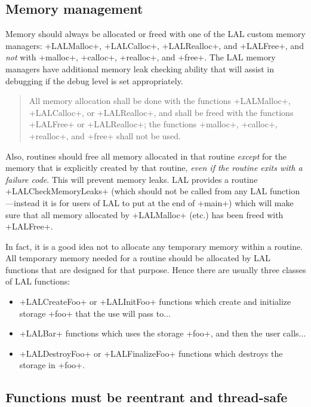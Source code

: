 \documentclass[10pt]{ligodcc}
\makeatletter
\def\verb{\relax\ifmmode\hbox\else\leavevmode\null\fi
  \bgroup
    \color{blue}\small
    \verb@eol@error \let\do\@makeother \dospecials
    \verbatim@font\@noligs
    \@ifstar\@sverb\@verb}
\newlength{\fminilength}
\newenvironment{fminipage}[1][\linewidth]
  {\setlength{\fminilength}{#1-2\fboxsep-2\fboxrule}%
   \begin{lrbox}{\fminibox}\begin{minipage}{\fminilength}}
  {\end{minipage}\end{lrbox}\noindent\fbox{\usebox{\fminibox}}}
\newenvironment{lalrule}{\begin{quote}\color{red}\begin{fminipage}}
  {\end{fminipage}\end{quote}}
\makeatother
\begin{document}
\subsection{Memory management}

Memory should always be allocated or freed with one of the LAL custom
memory managers: \verb+LALMalloc+, \verb+LALCalloc+, \verb+LALRealloc+,
and \verb+LALFree+, and \emph{not} with \verb+malloc+, \verb+calloc+,
\verb+realloc+, and \verb+free+.  The LAL memory managers have additional
memory leak checking ability that will assist in debugging if the debug
level is set appropriately.

\begin{lalrule}
All memory allocation shall be done with the functions \verb+LALMalloc+,
\verb+LALCalloc+, or \verb+LALRealloc+, and shall be freed with the functions
\verb+LALFree+ or \verb+LALRealloc+; the functions \verb+malloc+,
\verb+calloc+, \verb+realloc+, and \verb+free+ shall not be used.
\end{lalrule}

Also, routines should free all memory allocated in that routine \emph{except}
for the memory that is explicitly created by that routine, \emph{even if the
routine exits with a failure code}.  This will prevent memory leaks.  LAL
provides a routine \verb+LALCheckMemoryLeaks+ (which should not be called from
any LAL function---instead it is for users of LAL to put at the end of
\verb+main+) which will make sure that all memory allocated by \verb+LALMalloc+
(etc.) has been freed with \verb+LALFree+.

In fact, it is a good idea not to allocate any temporary memory within a
routine.  All temporary memory needed for a routine should be allocated by LAL
functions that are designed for that purpose.  Hence there are usually
three classes of LAL functions:
\begin{itemize}
\item \verb+LALCreateFoo+ or \verb+LALInitFoo+ functions which create and
initialize storage \verb+foo+ that the use will pass to...
\item \verb+LALBar+ functions which uses the storage \verb+foo+, and then
the user calls...
\item \verb+LALDestroyFoo+ or \verb+LALFinalizeFoo+ functions which destroys
the storage in \verb+foo+.
\end{itemize}


\subsection{Functions must be reentrant and thread-safe}
\end{document}
